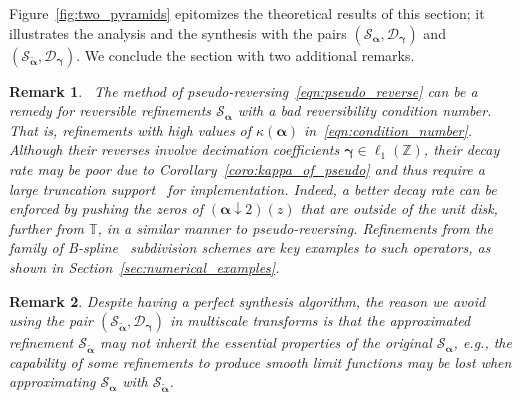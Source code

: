 \documentclass[12pt]{article}
\newtheorem{remark}{Remark}[section]
\begin{document}
Figure~\ref{fig:two_pyramids} epitomizes the theoretical results of this section; it illustrates the analysis and the synthesis with the pairs $(\mathcal{S}_{\boldsymbol{\alpha}}, \mathcal{D}_{\boldsymbol{\gamma}})$ and $(\mathcal{S}_{\widetilde{\boldsymbol{\alpha}}}, \mathcal{D}_{\boldsymbol{\gamma}})$. We conclude the section with two additional remarks.

\begin{remark}~\label{remark:Bspline}
    The method of pseudo-reversing~\eqref{eqn:pseudo_reverse} can be a remedy for reversible refinements $\mathcal{S}_{\boldsymbol{\alpha}}$ with a bad reversibility condition number. That is, refinements with high values of $\kappa(\boldsymbol{\alpha})$ in~\eqref{eqn:condition_number}. Although their reverses involve decimation coefficients $\boldsymbol{\gamma}\in\ell_1(\mathbb{Z})$, their decay rate may be poor due to Corollary~\ref{coro:kappa_of_pseudo} and thus require a large truncation support~\cite{mattar2023pyramid} for implementation. Indeed, a better decay rate can be enforced by pushing the zeros of $(\boldsymbol{\alpha}\downarrow2)(z)$ that are outside of the unit disk, further from $\mathbb{T}$, in a similar manner to pseudo-reversing. Refinements from the family of B-spline~\cite{de1978practical} subdivision schemes are key examples to such operators, as shown in Section~\ref{sec:numerical_examples}.
\end{remark}

\begin{remark}
    Despite having a perfect synthesis algorithm, the reason we avoid using the pair $(\mathcal{S}_{\widetilde{\boldsymbol{\alpha}}}, \mathcal{D}_{\boldsymbol{\gamma}})$ in multiscale transforms is that the approximated refinement $\mathcal{S}_{\widetilde{\boldsymbol{\alpha}}}$ may not inherit the essential properties of the original $\mathcal{S}_{\boldsymbol{\alpha}}$, e.g., the capability of some refinements to produce smooth limit functions may be lost when approximating $\mathcal{S}_{\boldsymbol{\alpha}}$ with $\mathcal{S}_{\widetilde{\boldsymbol{\alpha}}}$.
\end{remark}
\end{document}
